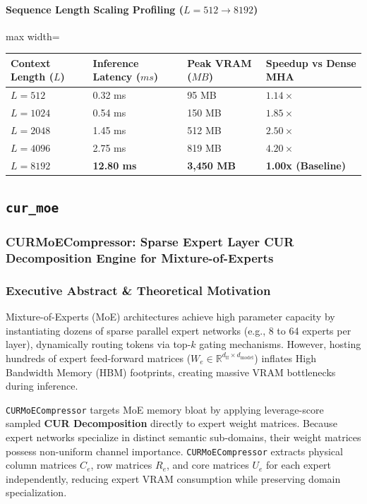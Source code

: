 \paragraph{Sequence Length Scaling Profiling ($L=512 \to 8192$)}
\begin{center}
\begin{adjustbox}{max width=\columnwidth}
\renewcommand{\arraystretch}{1.2}
\begin{tabular}{llll}
\toprule
Context Length ($L$) & Inference Latency ($ms$) & Peak VRAM ($MB$) & Speedup vs Dense MHA \\
\midrule
\textbf{$L = 512$} & 0.32 ms & 95 MB & $1.14\times$ \\
\textbf{$L = 1024$} & 0.54 ms & 150 MB & $1.85\times$ \\
\textbf{$L = 2048$} & 1.45 ms & 512 MB & $2.50\times$ \\
\textbf{$L = 4096$} & 2.75 ms & 819 MB & $4.20\times$ \\
\textbf{$L = 8192$} & \textbf{12.80 ms} & \textbf{3,450 MB} & \textbf{1.00x (Baseline)} \\


\bottomrule
\end{tabular}
\end{adjustbox}
\end{center}

\subsection{\texttt{cur\_moe}}
\subsubsection*{CURMoECompressor: Sparse Expert Layer CUR Decomposition Engine for Mixture-of-Experts}

\subsubsection*{Executive Abstract \& Theoretical Motivation}
Mixture-of-Experts (MoE) architectures achieve high parameter capacity by instantiating dozens of sparse parallel expert networks (e.g., 8 to 64 experts per layer), dynamically routing tokens via top-$k$ gating mechanisms. However, hosting hundreds of expert feed-forward matrices ($W_e \in \mathbb{R}^{d_{\text{ff}} \times d_{\text{model}}}$) inflates High Bandwidth Memory (HBM) footprints, creating massive VRAM bottlenecks during inference.

\texttt{CURMoECompressor} targets MoE memory bloat by applying leverage-score sampled \textbf{CUR Decomposition} directly to expert weight matrices. Because expert networks specialize in distinct semantic sub-domains, their weight matrices possess non-uniform channel importance. \texttt{CURMoECompressor} extracts physical column matrices $C_e$, row matrices $R_e$, and core matrices $U_e$ for each expert independently, reducing expert VRAM consumption while preserving domain specialization.


